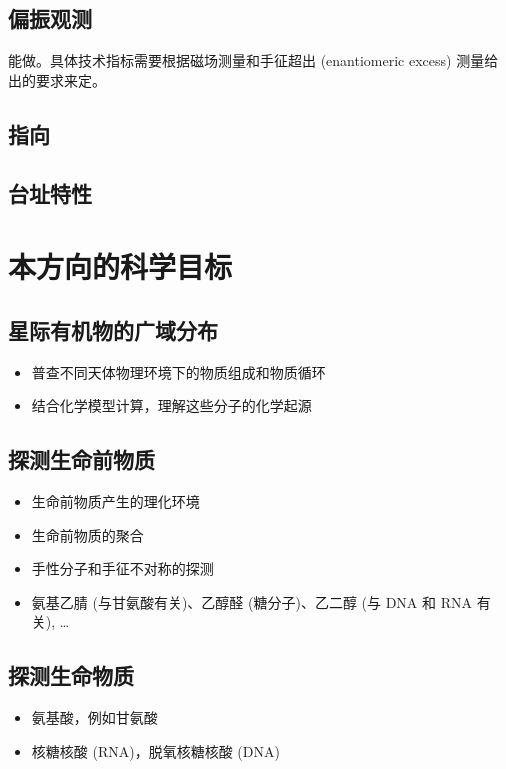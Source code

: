 \documentclass{article}
\begin{document}
\subsection{偏振观测}
能做。具体技术指标需要根据磁场测量和手征超出 (enantiomeric excess) 测量给出的要求来定。

\subsection{指向}

\subsection{台址特性}

\section{本方向的科学目标}

\subsection{星际有机物的广域分布}
  \begin{itemize}
    \item 普查不同天体物理环境下的物质组成和物质循环
    \item 结合化学模型计算，理解这些分子的化学起源
  \end{itemize}
\subsection{探测生命前物质}
  \begin{itemize}
    \item 生命前物质产生的理化环境
    \item 生命前物质的聚合
    \item 手性分子和手征不对称的探测
    \item 氨基乙腈 (与甘氨酸有关)、乙醇醛 (糖分子)、乙二醇 (与 DNA 和 RNA 有关), \ldots
  \end{itemize}
\subsection{探测生命物质}
  \begin{itemize}
    \item 氨基酸，例如甘氨酸
    \item 核糖核酸 (RNA)，脱氧核糖核酸 (DNA)
  \end{itemize}
\end{document}
